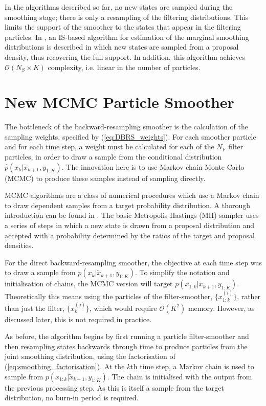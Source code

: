 \documentclass[10pt,twocolumn,twoside]{IEEEtran}
\begin{document}
In the algorithms described so far, no new states are sampled during the smoothing stage; there is only a resampling of the filtering distributions. This limits the support of the smoother to the states that appear in the filtering particles. In \cite{Fearnhead2010}, an IS-based algorithm for estimation of the marginal smoothing distributions is described in which new states are sampled from a proposal density, thus recovering the full support. In addition, this algorithm achieves $\mathcal{O}( N_S \times K)$ complexity, i.e. linear in the number of particles.



\section{New MCMC Particle Smoother} \label{sec:mcmc_smoother}

The bottleneck of the backward-resampling smoother is the calculation of the sampling weights, specified by (\ref{eq:DBRS_weights}). For each smoother particle and for each time step, a weight must be calculated for each of the $N_F$ filter particles, in order to draw a sample from the conditional distribution $\hat{p}(x_k|\tilde{x}_{k+1}, y_{1:K})$. The innovation here is to use Markov chain Monte Carlo (MCMC) to produce these samples instead of sampling directly.

MCMC algorithms are a class of numerical procedures which use a Markov chain to draw dependent samples from a target probability distribution. A thorough introduction can be found in \cite{Gilks1996}. The basic Metropolis-Hastings (MH) \cite{Hastings1970} sampler uses a series of steps in which a new state is drawn from a proposal distribution and accepted with a probability determined by the ratios of the target and proposal densities.

For the direct backward-resampling smoother, the objective at each time step was to draw a sample from $p(x_{k}|\tilde{x}_{k+1}, y_{1:K})$. To simplify the notation and initialisation of chains, the MCMC version will target $p(x_{1:k}|\tilde{x}_{k+1}, y_{1:K})$. Theoretically this means using the particles of the filter-smoother, $\{x_{1:k}^{(i)}\}$, rather than just the filter, $\{x_k^{(j)}\}$, which would require $\mathcal{O}(K^2)$ memory. However, as discussed later, this is not required in practice.

As before, the algorithm begins by first running a particle filter-smoother and then resampling states backwards through time to produce particles from the joint smoothing distribution, using the factorisation of (\ref{eq:smoothing_factorisation}). At the $k$th time step, a Markov chain is used to sample from $p(x_{1:k}|\tilde{x}_{k+1}, y_{1:K})$. The chain is initialised with the output from the previous processing step. As this is itself a sample from the target distribution, no burn-in period is required.
\end{document}
